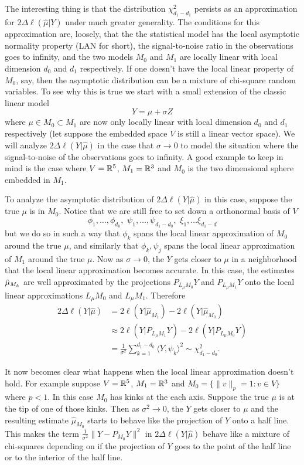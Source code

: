 \documentclass[11pt]{report}
\begin{document}
The interesting thing is that the distribution $\chi^2_{d_1 - d_1}$ persists as an approximation for $2\Delta \ell(\hat\mu|Y)$  under much greater generality. The conditions for this approximation  are, loosely, that the the statistical model has the local asymptotic normality property (LAN for short), the signal-to-noise ratio in the observations goes to infinity, and the two models $M_0$ and $M_1$ are locally linear with local dimension $d_0$ and $d_1$ respectively. If one doesn't have the local linear property of $M_0$, say, then the asymptotic distribution can be a mixture of chi-square random variables.
To see why this is true we start with a small extension of the classic linear model
\[ Y= \mu + {\sigma} Z \]
where $\mu\in M_0\subset M_1$ are now only locally linear  with local dimension $d_0$ and $d_1$ respectively (let suppose the embedded space $V$ is still a linear vector space). We will analyze  $2\Delta \ell(Y|\hat\mu)$  in the case that $\sigma\rightarrow 0$  to model the situation where the signal-to-noise of the observations goes to infinity.  A good example to keep in mind is  the case where  $V=\Bbb R^5$, $M_1=\Bbb R^3$ and $M_0$ is the two dimensional sphere embedded in $M_1$. 

To analyze the asymptotic distribution of $2\Delta \ell(Y|\hat\mu)$ in this case, suppose the true $\mu$ is in  $ M_0$.
Notice that we are still free to set down a orthonormal basis of $V$
\[\phi_1,\ldots, \phi_{d_0},\,\, \psi_{1},\ldots, \psi_{d_1 - d_0},\,\, \xi_1,\ldots \xi_{d_1 - d}\]
but we do so in such a way that ${\phi_k}$ spans the local linear approximation of $M_0$ around the true $\mu$, and similarly that ${\phi_k, \psi_j}$ spans the local linear approximation of $M_1$ around the true $\mu$.
Now as $\sigma\rightarrow 0$, the $Y$ gets closer to $\mu$ in a neighborhood that the local linear approximation becomes accurate. In this case, the estimates $\hat\mu_{\tiny M_k}$ are well approximated by the projections $P_{L_\mu M_0} Y$ and $P_{L_\mu M_1} Y$ onto the local linear approximations $L_\mu M_0$ and $L_\mu M_1$. Therefore
\begin{align*}
2\Delta \ell(Y|\hat\mu) 
&= 2\ell(Y|\hat\mu_{M_1}) - 2\ell(Y|\hat\mu_{M_0}) \\
&\approx 2\ell(Y|P_{L_\mu M_1}Y) - 2\ell(Y|P_{L_\mu M_0}Y) \\
 &= \frac{1}{\sigma^2}  \sum_{k=1}^{d_1-d_0}{\langle Y,\psi_k \rangle^2} \sim \chi^2_{d_1 - d_0}.
\end{align*}


It now becomes clear what happens when the local linear approximation doesn't hold. For example suppose $V=\Bbb R^5$, $M_1=\Bbb R^3$ and $M_0=\{ \|v\|_p=1: v\in V\}$ where $p<1$. In this case $M_0$ has kinks at the each axis. Suppose the true $\mu$ is at the tip of one of those kinks. Then as $\sigma^2\rightarrow 0$, the $Y$ gets closer to $\mu$ and the resulting estimate $\hat\mu_{M_0}$ starts to behave like the projection of $Y$ onto a half line. This makes the term $\frac{1}{\sigma^2} \|Y - P_{M_0}Y \|^2$ in $2\Delta \ell(Y|\hat\mu) $ behave like a mixture of chi-squares depending on if the projection of $Y$ goes to the point of the half line or to the interior of the half line. 
\end{document}
